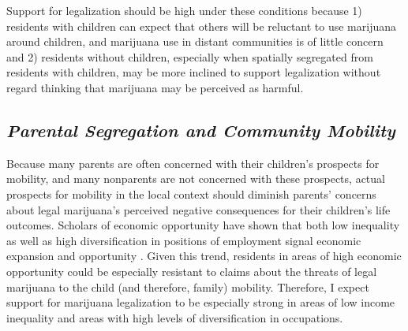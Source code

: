 Support for legalization should be high under these conditions because 1) residents with children can expect that others will be reluctant to use marijuana around children, and marijuana use in distant communities is of little concern and 2) residents without children, especially when spatially segregated from residents with children, may be more inclined to support legalization without regard thinking that marijuana may be perceived as harmful.


\subsection{\it{Parental Segregation and Community Mobility}}


Because many parents are often concerned with their children's prospects for mobility, and many nonparents are not concerned with these prospects, actual prospects for mobility in the local context should diminish parents' concerns about legal marijuana's perceived negative consequences for their children's life outcomes. Scholars of economic opportunity have shown that both low inequality as well as high diversification in positions of employment signal economic expansion and opportunity \citep{blau_and_duncan_1967,moore_1966}. Given this trend, residents in areas of high economic opportunity could be especially resistant to claims about the threats of legal marijuana to the child (and therefore, family) mobility. Therefore, I expect support for marijuana legalization to be especially strong in areas of low income inequality and areas with high levels of diversification in occupations. 



